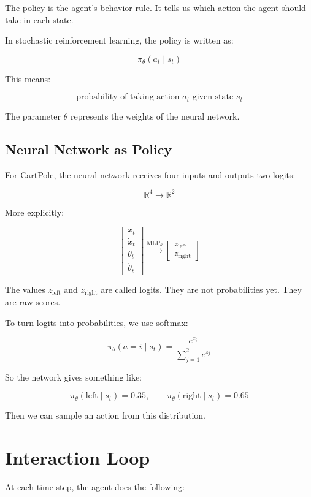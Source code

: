 \documentclass[11pt]{article}
\begin{document}
The policy is the agent's behavior rule.
It tells us which action the agent should take in each state.

In stochastic reinforcement learning, the policy is written as:

\[
\pi_\theta(a_t \mid s_t)
\]

This means:

\[
\boxed{
\text{probability of taking action } a_t \text{ given state } s_t
}
\]

The parameter $\theta$ represents the weights of the neural network.

\subsection{Neural Network as Policy}

For CartPole, the neural network receives four inputs and outputs two logits:

\[
\mathbb{R}^4 \rightarrow \mathbb{R}^2
\]

More explicitly:

\[
\begin{bmatrix}
 x_t \\
 \dot{x}_t \\
 \theta_t \\
 \dot{\theta}_t
\end{bmatrix}
\xrightarrow{\text{MLP}_\theta}
\begin{bmatrix}
 z_{\text{left}} \\
 z_{\text{right}}
\end{bmatrix}
\]

The values $z_{\text{left}}$ and $z_{\text{right}}$ are called logits.
They are not probabilities yet.
They are raw scores.

To turn logits into probabilities, we use softmax:

\[
\pi_\theta(a=i \mid s_t)
= \frac{e^{z_i}}{\sum_{j=1}^{2} e^{z_j}}
\]

So the network gives something like:

\[
\pi_\theta(\text{left} \mid s_t) = 0.35,
\qquad
\pi_\theta(\text{right} \mid s_t) = 0.65
\]

Then we can sample an action from this distribution.

\section{Interaction Loop}

At each time step, the agent does the following:
\end{document}

